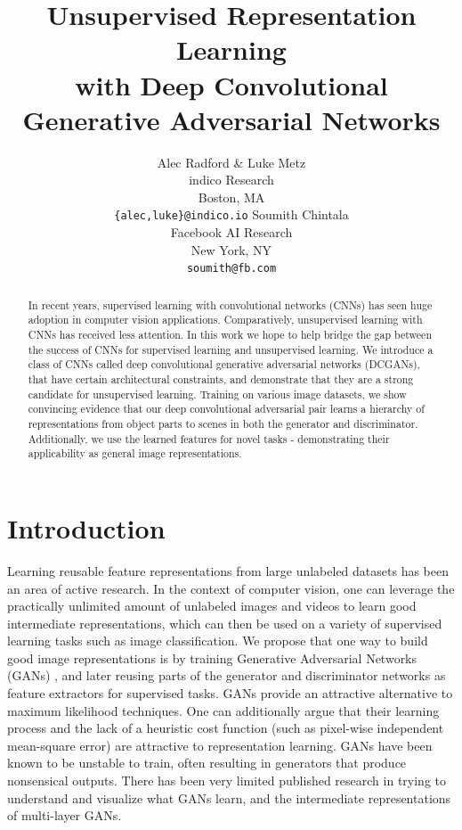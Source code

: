 \documentclass{article} %
\title{Unsupervised Representation Learning\\ with Deep Convolutional\\ Generative Adversarial Networks}
\author{Alec Radford \& Luke Metz\\
indico Research\\
Boston, MA\\
\texttt{\{alec,luke\}@indico.io}
\AND
Soumith Chintala\\
Facebook AI Research\\
New York, NY\\
\texttt{soumith@fb.com}
}
\begin{document}
\maketitle

\begin{abstract}
In recent years, supervised learning with convolutional networks (CNNs) has seen huge adoption in computer vision applications. Comparatively, unsupervised learning with CNNs has received less attention. In this work we hope to help bridge the gap between the success of CNNs for supervised learning and unsupervised learning. We introduce a class of CNNs called deep convolutional generative adversarial networks (DCGANs), that have certain architectural constraints,  and demonstrate that they are a strong candidate for unsupervised learning. Training on various image datasets, we show convincing evidence that our deep convolutional adversarial pair learns a hierarchy of representations from object parts to scenes in both the generator and discriminator. Additionally, we use the learned features for novel tasks - demonstrating their applicability as general image representations.
\end{abstract}

\section{Introduction}

Learning reusable feature representations from large unlabeled datasets has been an area of active research. In the context of computer vision, one can leverage the practically unlimited amount of unlabeled images and videos to learn good intermediate representations, which can then be used on a variety of supervised learning tasks such as image classification. We propose that one way to build good image representations is by training Generative Adversarial Networks (GANs) \citep{Goodfellow2014}, and later reusing parts of the generator and discriminator networks as feature extractors for supervised tasks. GANs provide an attractive alternative to maximum likelihood techniques. One can additionally argue that their learning process and the lack of a heuristic cost function (such as pixel-wise independent mean-square error) are attractive to representation learning. GANs have been known to be unstable to train, often resulting in generators that produce nonsensical outputs. There has been very limited published research in trying to understand and visualize what GANs learn, and the intermediate representations of multi-layer GANs.
\end{document}
